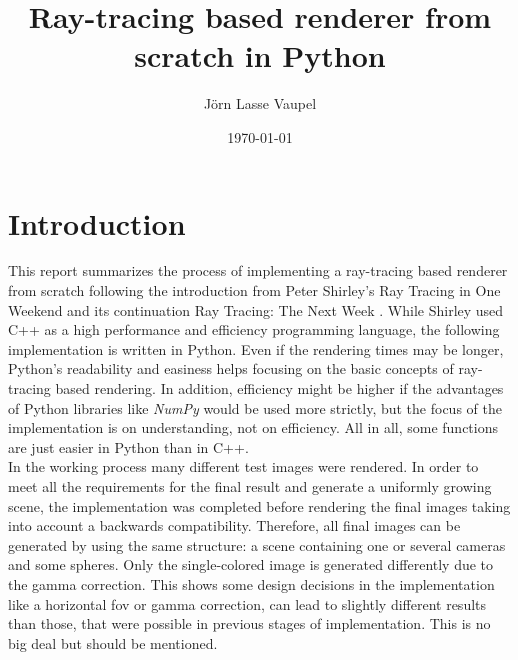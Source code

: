 \documentclass[]{article}
\title{Ray-tracing based renderer from scratch in Python}
\author{Jörn Lasse Vaupel}
\date{\today}
\begin{document}
	
	\maketitle
	\newpage
	\tableofcontents
	
	\begin{abstract}
		
	\end{abstract}

	\newpage
	
	\section{Introduction}
	\label{sec:intro}
	This report summarizes the process of implementing a ray-tracing based renderer from scratch following the introduction from Peter Shirley’s Ray Tracing in One Weekend  \cite{Shirley2020RTW1} and its continuation Ray Tracing: The Next Week \cite{Shirley2020RTW2}. While Shirley used C++ as a high performance and efficiency programming language, the following implementation is written in Python.  Even if the rendering times may be longer, Python’s readability and easiness helps focusing on the basic concepts of ray-tracing based rendering. In addition, efficiency might be higher if the advantages of Python libraries like \emph{NumPy} would be used more strictly, but the focus of the implementation is on understanding, not on efficiency. All in all, some functions are just easier in Python than in C++.
	\\
	In the working process many different test images were rendered. In order to meet all the requirements for the final result and generate a uniformly growing scene, the implementation was completed before rendering the final images taking into account a backwards compatibility. Therefore, all final images can be generated by using the same structure: a scene containing one or several cameras and some spheres. Only the single-colored image is generated differently due to the gamma correction. This shows some design decisions in the implementation like a horizontal \ac{fov} or gamma correction, can lead to slightly different results than those, that were possible in previous stages of implementation. This is no big deal but should be mentioned.
	
\end{document}
